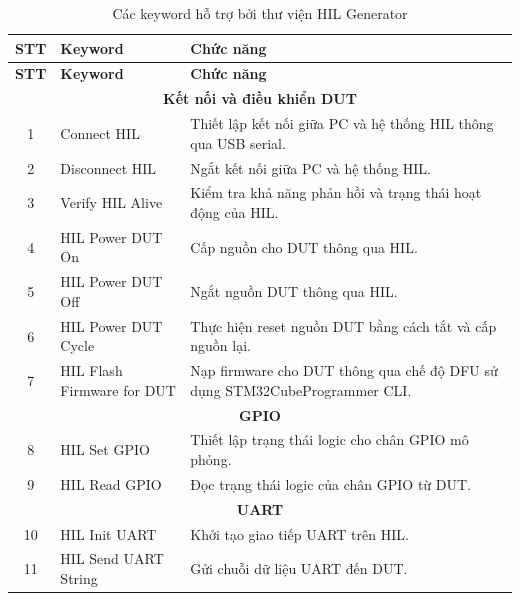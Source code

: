 \begin{longtable}{|c|p{4.8cm}|p{7.8cm}|}
\caption{Các keyword hỗ trợ bởi thư viện HIL Generator}
\label{tab:hil_keywords} \\

\hline
\textbf{STT} & \textbf{Keyword} & \textbf{Chức năng} \\
\hline
\endfirsthead

\hline
\textbf{STT} & \textbf{Keyword} & \textbf{Chức năng} \\
\hline
\endhead

\multicolumn{3}{|c|}{\textbf{Kết nối và điều khiển DUT}} \\
\hline

1 & Connect HIL
& Thiết lập kết nối giữa PC và hệ thống HIL thông qua USB serial. \\
\hline

2 & Disconnect HIL
& Ngắt kết nối giữa PC và hệ thống HIL. \\
\hline

3 & Verify HIL Alive
& Kiểm tra khả năng phản hồi và trạng thái hoạt động của HIL. \\
\hline

4 & HIL Power DUT On
& Cấp nguồn cho DUT thông qua HIL. \\
\hline

5 & HIL Power DUT Off
& Ngắt nguồn DUT thông qua HIL. \\
\hline

6 & HIL Power DUT Cycle
& Thực hiện reset nguồn DUT bằng cách tắt và cấp nguồn lại. \\
\hline

7 & HIL Flash Firmware for DUT
& Nạp firmware cho DUT thông qua chế độ DFU sử dụng STM32CubeProgrammer CLI. \\
\hline

\multicolumn{3}{|c|}{\textbf{GPIO}} \\
\hline

8 & HIL Set GPIO
& Thiết lập trạng thái logic cho chân GPIO mô phỏng. \\
\hline

9 & HIL Read GPIO
& Đọc trạng thái logic của chân GPIO từ DUT. \\
\hline

\multicolumn{3}{|c|}{\textbf{UART}} \\
\hline

10 & HIL Init UART
& Khởi tạo giao tiếp UART trên HIL. \\
\hline

11 & HIL Send UART String
& Gửi chuỗi dữ liệu UART đến DUT. \\
\hline


\end{longtable}
